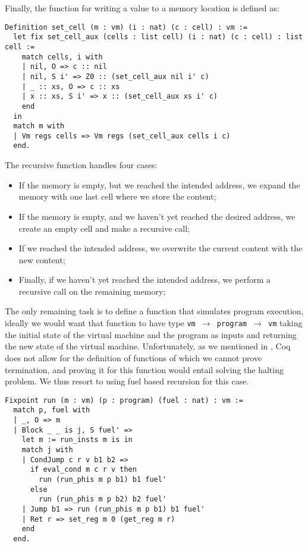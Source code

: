 Finally, the function for writing a value to a memory location is defined as:

\begin{lstlisting}[style=Coq]
Definition set_cell (m : vm) (i : nat) (c : cell) : vm :=
  let fix set_cell_aux (cells : list cell) (i : nat) (c : cell) : list cell :=
    match cells, i with
    | nil, O => c :: nil
    | nil, S i' => Z0 :: (set_cell_aux nil i' c)
    | _ :: xs, O => c :: xs
    | x :: xs, S i' => x :: (set_cell_aux xs i' c)
    end
  in
  match m with
  | Vm regs cells => Vm regs (set_cell_aux cells i c)
  end.
\end{lstlisting}

The recursive function handles four cases:
\begin{itemize}
  \item If the memory is empty, but we reached the intended address, we expand the memory with one last cell where we store the content;
  \item If the memory is empty, and we haven't yet reached the desired address, we create an empty cell and make a recursive call;
  \item If we reached the intended address, we overwrite the current content with the new content;
  \item Finally, if we haven't yet reached the intended address, we perform a recursive call on the remaining memory;
\end{itemize}

The only remaining task is to define a function that simulates program execution, ideally we would want that function to have type \texttt{vm $\to$ program $\to$ vm} taking the initial state of the virtual machine and the program as inputs and returning the new state of the virtual machine.
Unfortunately, as we mentioned in , Coq does not allow for the definition of functions of which we cannot prove termination, and proving it for this function would entail solving the halting problem. We thus resort to using fuel based recursion for this case.

\begin{lstlisting}[style=Coq]
Fixpoint run (m : vm) (p : program) (fuel : nat) : vm :=
  match p, fuel with
  | _, O => m
  | Block _ _ is j, S fuel' =>
    let m := run_insts m is in
    match j with
    | CondJump c r v b1 b2 =>
      if eval_cond m c r v then
        run (run_phis m p b1) b1 fuel'
      else
        run (run_phis m p b2) b2 fuel'
    | Jump b1 => run (run_phis m p b1) b1 fuel'
    | Ret r => set_reg m 0 (get_reg m r)
    end
  end.
\end{lstlisting}

